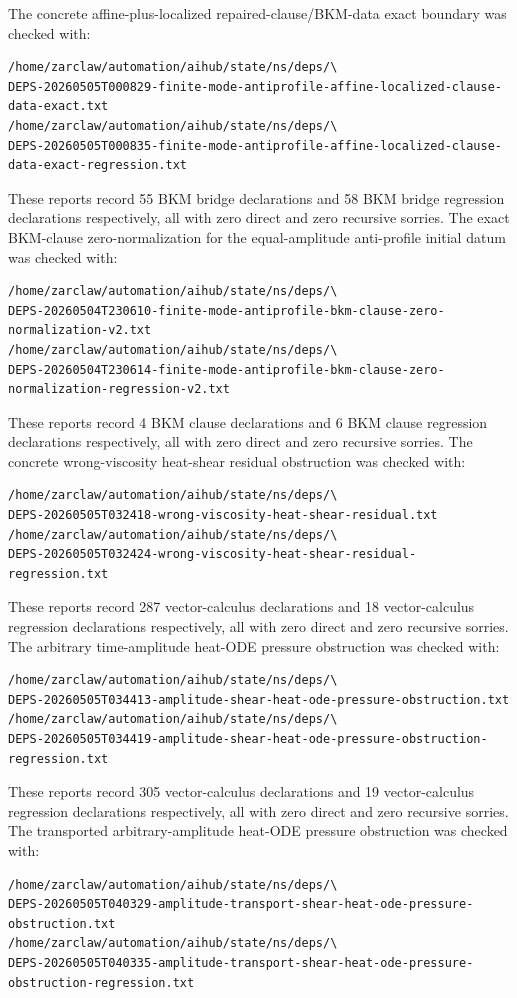 \documentclass[11pt]{article}
\begin{document}
The concrete affine-plus-localized repaired-clause/BKM-data exact boundary was
checked with:
\begin{verbatim}
/home/zarclaw/automation/aihub/state/ns/deps/\
DEPS-20260505T000829-finite-mode-antiprofile-affine-localized-clause-data-exact.txt
/home/zarclaw/automation/aihub/state/ns/deps/\
DEPS-20260505T000835-finite-mode-antiprofile-affine-localized-clause-data-exact-regression.txt
\end{verbatim}
These reports record 55 BKM bridge declarations and 58 BKM bridge regression
declarations respectively, all with zero direct and zero recursive sorries.
The exact BKM-clause zero-normalization for the equal-amplitude anti-profile
initial datum was checked with:
\begin{verbatim}
/home/zarclaw/automation/aihub/state/ns/deps/\
DEPS-20260504T230610-finite-mode-antiprofile-bkm-clause-zero-normalization-v2.txt
/home/zarclaw/automation/aihub/state/ns/deps/\
DEPS-20260504T230614-finite-mode-antiprofile-bkm-clause-zero-normalization-regression-v2.txt
\end{verbatim}
These reports record 4 BKM clause declarations and 6 BKM clause regression
declarations respectively, all with zero direct and zero recursive sorries.
The concrete wrong-viscosity heat-shear residual obstruction was checked with:
\begin{verbatim}
/home/zarclaw/automation/aihub/state/ns/deps/\
DEPS-20260505T032418-wrong-viscosity-heat-shear-residual.txt
/home/zarclaw/automation/aihub/state/ns/deps/\
DEPS-20260505T032424-wrong-viscosity-heat-shear-residual-regression.txt
\end{verbatim}
These reports record 287 vector-calculus declarations and 18 vector-calculus
regression declarations respectively, all with zero direct and zero recursive
sorries.
The arbitrary time-amplitude heat-ODE pressure obstruction was checked with:
\begin{verbatim}
/home/zarclaw/automation/aihub/state/ns/deps/\
DEPS-20260505T034413-amplitude-shear-heat-ode-pressure-obstruction.txt
/home/zarclaw/automation/aihub/state/ns/deps/\
DEPS-20260505T034419-amplitude-shear-heat-ode-pressure-obstruction-regression.txt
\end{verbatim}
These reports record 305 vector-calculus declarations and 19 vector-calculus
regression declarations respectively, all with zero direct and zero recursive
sorries.
The transported arbitrary-amplitude heat-ODE pressure obstruction was checked
with:
\begin{verbatim}
/home/zarclaw/automation/aihub/state/ns/deps/\
DEPS-20260505T040329-amplitude-transport-shear-heat-ode-pressure-obstruction.txt
/home/zarclaw/automation/aihub/state/ns/deps/\
DEPS-20260505T040335-amplitude-transport-shear-heat-ode-pressure-obstruction-regression.txt
\end{verbatim}
\end{document}
